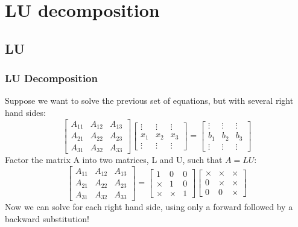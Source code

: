\section{LU decomposition}
\subsection*{LU}

\begin{frame}[fragile]
  \frametitle{LU Decomposition}
  Suppose we want to solve the previous set of equations, but with several right hand sides:
    \[ 
    \begin{bmatrix}
A_{11} & A_{12} & A_{13}\\ 
A_{21} & A_{22} & A_{23}\\ 
A_{31} & A_{32} & A_{33}
\end{bmatrix}
\begin{bmatrix}
\vdots & \vdots & \vdots \\
x_1 & x_2 & x_3 \\
\vdots & \vdots & \vdots
\end{bmatrix} = 
\begin{bmatrix}
\vdots & \vdots & \vdots \\
b_1 & b_2 & b_3 \\
\vdots & \vdots & \vdots
\end{bmatrix}
\]\pause
Factor the matrix A into two matrices, L and U, such that $A=LU$:
\[ 
    \begin{bmatrix}
A_{11} & A_{12} & A_{13}\\ 
A_{21} & A_{22} & A_{23}\\ 
A_{31} & A_{32} & A_{33}
\end{bmatrix} = 
\begin{bmatrix}
1 & 0 & 0 \\
\times & 1 & 0 \\
\times & \times & 1
\end{bmatrix}
\begin{bmatrix}
\times & \times & \times \\
0 & \times & \times \\
0 & 0 & \times
\end{bmatrix}
\]
Now we can solve for each right hand side, using only a forward
followed by a backward substitution!
\end{frame}

